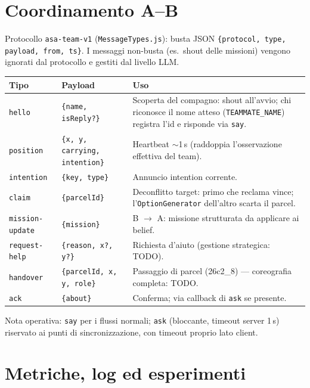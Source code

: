 \documentclass[11pt,a4paper]{article}
\newcommand{\file}[1]{\texttt{#1}}
\newcommand{\code}[1]{\texttt{#1}}
\begin{document}
\section{Coordinamento A--B}

Protocollo \code{asa-team-v1} (\file{MessageTypes.js}): busta JSON
\code{\{protocol, type, payload, from, ts\}}. I messaggi non-busta (es.\
shout delle missioni) vengono ignorati dal protocollo e gestiti dal
livello LLM.

\begin{longtable}{@{}llp{}@{}}
\toprule
\textbf{Tipo} & \textbf{Payload} & \textbf{Uso} \\
\midrule
\code{hello} & \code{\{name, isReply?\}} & Scoperta del compagno: shout
  all'avvio; chi riconosce il nome atteso (\code{TEAMMATE\_NAME}) registra
  l'id e risponde via \code{say}. \\
\code{position} & \code{\{x, y, carrying, intention\}} & Heartbeat
  $\sim$1\,s (raddoppia l'osservazione effettiva del team). \\
\code{intention} & \code{\{key, type\}} & Annuncio intention corrente. \\
\code{claim} & \code{\{parcelId\}} & Deconflitto target: primo che reclama
  vince; l'\code{OptionGenerator} dell'altro scarta il parcel. \\
\code{mission-update} & \code{\{mission\}} & B $\rightarrow$ A: missione
  strutturata da applicare ai belief. \\
\code{request-help} & \code{\{reason, x?, y?\}} & Richiesta d'aiuto
  (gestione strategica: TODO). \\
\code{handover} & \code{\{parcelId, x, y, role\}} & Passaggio di parcel
  (26c2\_8) — coreografia completa: TODO. \\
\code{ack} & \code{\{about\}} & Conferma; via callback di \code{ask} se
  presente. \\
\bottomrule
\end{longtable}

Nota operativa: \code{say} per i flussi normali; \code{ask} (bloccante,
timeout server 1\,s) riservato ai punti di sincronizzazione, con timeout
proprio lato client.

\section{Metriche, log ed esperimenti}
\end{document}
